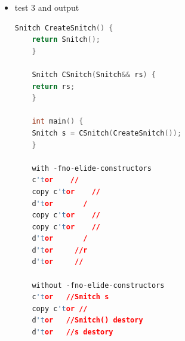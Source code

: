 \documentclass[a4paper,12pt,twoside]{book}
\begin{document}
\begin{itemize}
	\item test 3 and output
	\begin{lstlisting}[frame=single, language=c++]
	Snitch CreateSnitch() {
	return Snitch();
	}
	
	Snitch CSnitch(Snitch&& rs) {
	return rs;
	}
	
	int main() {
	Snitch s = CSnitch(CreateSnitch());
	}
	
	with -fno-elide-constructors
	c'tor    //
	copy c'tor    //
	d'tor       /
	copy c'tor    //
	copy c'tor    //
	d'tor       /
	d'tor     //r
	d'tor     //
	
	without -fno-elide-constructors
	c'tor   //Snitch s
	copy c'tor //
	d'tor   //Snitch() destory
	d'tor   //s destory
	\end{lstlisting}
\end{itemize}
\end{document}
